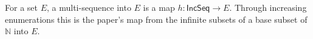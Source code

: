 \begin{definition}
For a set $E$, a multi-sequence into $E$ is a map
$h:\mathsf{IncSeq}\to E$.  Through increasing enumerations this is the
paper's map from the infinite subsets of a base subset of $\mathbb N$ into
$E$.
\end{definition}
